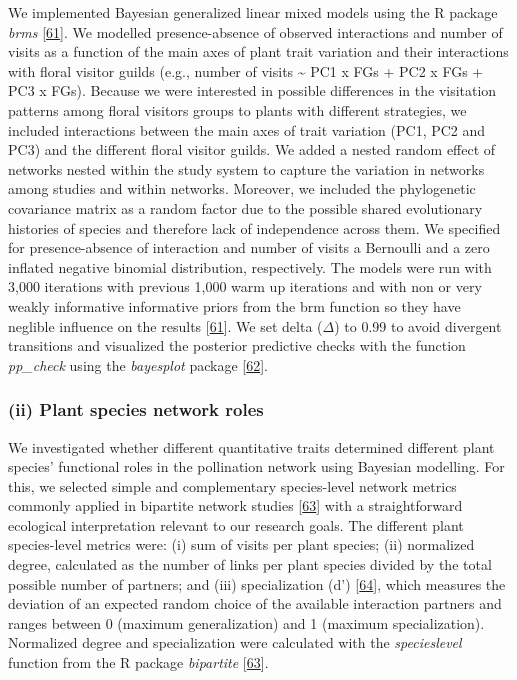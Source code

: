 \documentclass[
  12pt,
  a4paper,
]{article}
\begin{document}
We implemented Bayesian generalized linear mixed models using the R package \emph{brms} {[}\protect\hyperlink{ref-burkner2017}{61}{]}. We modelled presence-absence of observed interactions and number of visits as a function of the main axes of plant trait variation and their interactions with floral visitor guilds (e.g., number of visits \textasciitilde{} PC1 x FGs + PC2 x FGs + PC3 x FGs). Because we were interested in possible differences in the visitation patterns among floral visitors groups to plants with different strategies, we included interactions between the main axes of trait variation (PC1, PC2 and PC3) and the different floral visitor guilds. We added a nested random effect of networks nested within the study system to capture the variation in networks among studies and within networks. Moreover, we included the phylogenetic covariance matrix as a random factor due to the possible shared evolutionary histories of species and therefore lack of independence across them. We specified for presence-absence of interaction and number of visits a Bernoulli and a zero inflated negative binomial distribution, respectively. The models were run with 3,000 iterations with previous 1,000 warm up iterations and with non or very weakly informative informative priors from the brm function so they have neglible influence on the results {[}\protect\hyperlink{ref-burkner2017}{61}{]}. We set delta (\(\Delta\)) to 0.99 to avoid divergent transitions and visualized the posterior predictive checks with the function \emph{pp\_check} using the \emph{bayesplot} package {[}\protect\hyperlink{ref-gabry2019}{62}{]}.

\hypertarget{ii-plant-species-network-roles}{%
\subsubsection{(ii) Plant species network roles}\label{ii-plant-species-network-roles}}

We investigated whether different quantitative traits determined different plant species' functional roles in the pollination network using Bayesian modelling. For this, we selected simple and complementary species-level network metrics commonly applied in bipartite network studies {[}\protect\hyperlink{ref-dormann2008}{63}{]} with a straightforward ecological interpretation relevant to our research goals. The different plant species-level metrics were: (i) sum of visits per plant species; (ii) normalized degree, calculated as the number of links per plant species divided by the total possible number of partners; and (iii) specialization (d') {[}\protect\hyperlink{ref-bluthgen2006}{64}{]}, which measures the deviation of an expected random choice of the available interaction partners and ranges between 0 (maximum generalization) and 1 (maximum specialization). Normalized degree and specialization were calculated with the \emph{specieslevel} function from the R package \emph{bipartite} {[}\protect\hyperlink{ref-dormann2008}{63}{]}.
\end{document}
